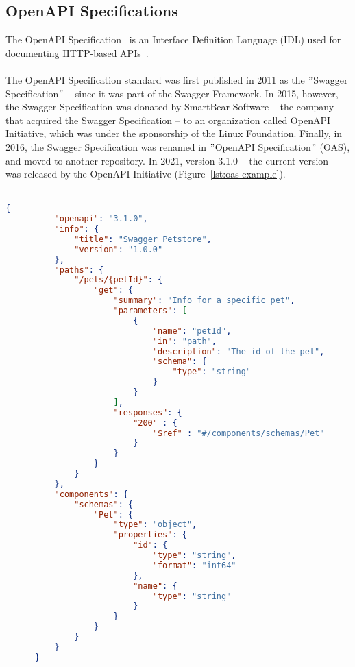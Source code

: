 \subsection{OpenAPI Specifications}\label{subsec:openapi-specifications}
The OpenAPI Specification~\cite{noauthor_openapi_nodate} is an Interface Definition Language (IDL) used for documenting HTTP-based APIs~\cite{de_api_2017}. \\ \\
The OpenAPI Specification standard was first published in 2011 as the \("\)Swagger Specification\("\) -- since it was part of the Swagger Framework.
In 2015, however, the Swagger Specification was donated by SmartBear Software -- the company that acquired the Swagger Specification -- to an organization called OpenAPI Initiative, which was under the sponsorship of the Linux Foundation.
Finally, in 2016, the Swagger Specification was renamed in \("\)OpenAPI Specification\("\) (OAS), and moved to another repository.
In 2021, version 3.1.0 -- the current version -- was released by the OpenAPI Initiative (Figure~\ref{lst:oas-example}). \\ \\

\begin{lstlisting}[label={lst:oas-example},language=json,caption={Example of an OAS JSON document},captionpos=b,breaklines=true]
      {
          "openapi": "3.1.0",
          "info": {
              "title": "Swagger Petstore",
              "version": "1.0.0"
          },
          "paths": {
              "/pets/{petId}": {
                  "get": {
                      "summary": "Info for a specific pet",
                      "parameters": [
                          {
                              "name": "petId",
                              "in": "path",
                              "description": "The id of the pet",
                              "schema": {
                                  "type": "string"
                              }
                          }
                      ],
                      "responses": {
                          "200" : {
                              "$ref" : "#/components/schemas/Pet"
                          }
                      }
                  }
              }
          },
          "components": {
              "schemas": {
                  "Pet": {
                      "type": "object",
                      "properties": {
                          "id": {
                              "type": "string",
                              "format": "int64"
                          },
                          "name": {
                              "type": "string"
                          }
                      }
                  }
              }
          }
      }
\end{lstlisting}

